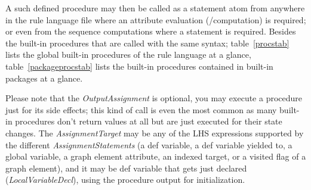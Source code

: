 A such defined procedure may then be called as a statement atom from anywhere in the rule language file where an attribute evaluation (/computation) is required; or even from the sequence computations where a statement is required.
Besides the built-in procedures that are called with the same syntax;
table~\ref{procstab} lists the global built-in procedures of the rule language at a glance,
table~\ref{packageprocstab} lists the built-in procedures contained in built-in packages at a glance.

Please note that the \emph{OutputAssignment} is optional, you may execute a procedure just for its side effects; this kind of call is even the most common as many built-in procedures don't return values at all but are just executed for their state changes.
The \emph{AssignmentTarget} may be any of the LHS expressions supported by the different \emph{AssignmentStatements} (a def variable, a def variable yielded to, a global variable, a graph element attribute, an indexed target, or a visited flag of a graph element), and it may be def variable that gets just declared (\emph{LocalVariableDecl}), using the procedure output for initialization.

